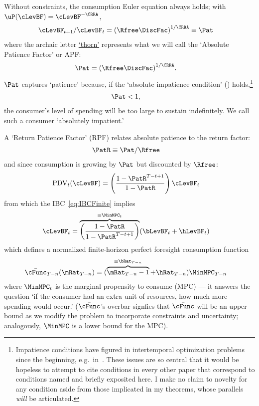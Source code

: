 \documentclass[ProjectDLO]{subfiles}
\begin{document}
Without constraints, the consumption Euler equation always holds; with $\uP(\cLevBF)=\cLevBF^{-\CRRA}$, \hypertarget{Pat}{}
\begin{align}
  \cLevBF_{t+1}/\cLevBF_{t}  & = {(\Rfree\DiscFac)}^{1/\CRRA} \equiv \Pat   \label{eq:Pat}
\end{align}
where the archaic letter \href{https://en.wikipedia.org/wiki/Thorn_(letter)}{`thorn'} represents what we will call the `Absolute Patience Factor' or APF:\@
\begin{align}
  \Pat & = {(\Rfree\DiscFac)}^{1/\CRRA} \label{eq:APF}.
\end{align}
$\Pat$ captures `patience' because, if the `absolute impatience condition' (\AIC) holds,\footnote{Impatience conditions have figured in intertemporal optimization problems since the beginning, e.g.\ in~\cite{ramseySave}.  These issues are so central that it would be hopeless to attempt to cite conditions in every other paper that correspond to conditions named and briefly exposited here.  I make no claim to novelty for any condition aside from those implicated in my theorems, whose parallels \textit{will} be articulated.}
\begin{align}
  \label{eq:AIC}
  \Pat  & < 1,
\end{align}
the consumer's level of spending will be too large to sustain indefinitely.  We call such a consumer `absolutely impatient.'\hypertarget{RPF}{}

A `Return Patience Factor' (RPF) relates absolute patience to the return factor:
\begin{align}
  \PatR  & \equiv  {\Pat}/\Rfree \label{eq:PatR}
\end{align}
and since consumption is growing by $\Pat$ but discounted by $\Rfree$:
\begin{align}
  \mathrm{PDV}_{t}(\cLevBF)  & = \left(\frac{1-\PatR^{T-t+1}}{1-\PatR}\right)\cLevBF_{t}
\end{align}
from which the IBC~\eqref{eq:IBCFinite} implies
\begin{align}
  \cLevBF_{t}  & = \overbrace{\left(\frac{1-\PatR}{1-\PatR^{T-t+1}}\right)}^{\equiv \MinMPC_{t}}
                 (\bLevBF_{t}+\hLevBF_{t})   \label{eq:WDef}
\end{align}
which defines a normalized finite-horizon perfect foresight consumption function
\begin{align}
  \bar{\cFunc}_{T-n}(\mRat_{T-n})  & = (\overbrace{\mRat_{T-n}-1}^{
                                     \equiv\bRat_{T-n}}+\hRat_{T-n})\MinMPC_{T-n}
\end{align}
where $\MinMPC_{t}$ is the marginal propensity to consume (MPC) --- it answers the
question `if the consumer had an extra unit of resources, how much more spending would occur.' \hypertarget{RIC}{}
($\bar{\cFunc}$'s overbar signfies that $\bar{\cFunc}$ will be an upper bound as we modify the problem to incorporate constraints and uncertainty; analogously, $\MinMPC$ is a lower bound for the MPC).
\end{document}
